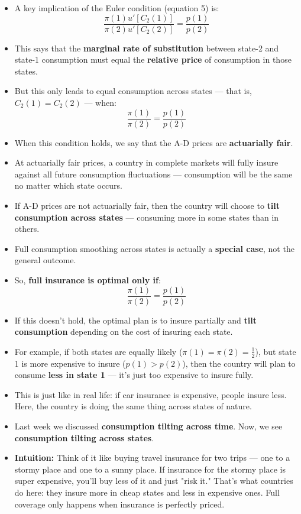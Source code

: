 \documentclass[12pt]{article}
\begin{document}
\begin{itemize}
\item A key implication of the Euler condition (equation 5) is:
\[
\frac{\pi(1) u'[C_2(1)]}{\pi(2) u'[C_2(2)]} = \frac{p(1)}{p(2)} \tag{9}
\]

\item This says that the \textbf{marginal rate of substitution} between state-2 and state-1 consumption must equal the \textbf{relative price} of consumption in those states.

\item But this only leads to equal consumption across states — that is, \( C_2(1) = C_2(2) \) — when:
\[
\frac{\pi(1)}{\pi(2)} = \frac{p(1)}{p(2)}
\]

\item When this condition holds, we say that the A-D prices are \textbf{actuarially fair}.

\item At actuarially fair prices, a country in complete markets will fully insure against all future consumption fluctuations — consumption will be the same no matter which state occurs.

\item If A-D prices are not actuarially fair, then the country will choose to \textbf{tilt consumption across states} — consuming more in some states than in others.

\item Full consumption smoothing across states is actually a \textbf{special case}, not the general outcome.

\item So, \textbf{full insurance is optimal only if}:
\[
\frac{\pi(1)}{\pi(2)} = \frac{p(1)}{p(2)}
\]

\item If this doesn't hold, the optimal plan is to insure partially and \textbf{tilt consumption} depending on the cost of insuring each state.

\item For example, if both states are equally likely (\( \pi(1) = \pi(2) = \frac{1}{2} \)), but state 1 is more expensive to insure (\( p(1) > p(2) \)), then the country will plan to consume \textbf{less in state 1} — it's just too expensive to insure fully.

\item This is just like in real life: if car insurance is expensive, people insure less. Here, the country is doing the same thing across states of nature.

\item Last week we discussed \textbf{consumption tilting across time}. Now, we see \textbf{consumption tilting across states}.

\item \textbf{Intuition:} Think of it like buying travel insurance for two trips — one to a stormy place and one to a sunny place. If insurance for the stormy place is super expensive, you'll buy less of it and just "risk it." That’s what countries do here: they insure more in cheap states and less in expensive ones. Full coverage only happens when insurance is perfectly priced.
\end{itemize}
\end{document}
